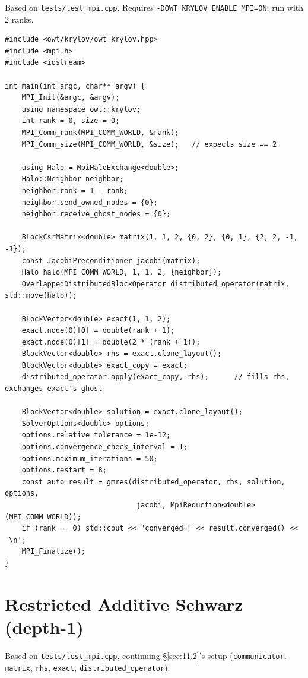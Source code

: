 \documentclass[11pt,a4paper]{report}
\newcommand{\secref}[1]{\S\ref{#1}}
\begin{document}
Based on \texttt{tests/test\_mpi.cpp}. Requires
\lstinline!-DOWT_KRYLOV_ENABLE_MPI=ON!; run with 2 ranks.

\begin{lstlisting}
#include <owt/krylov/owt_krylov.hpp>
#include <mpi.h>
#include <iostream>

int main(int argc, char** argv) {
    MPI_Init(&argc, &argv);
    using namespace owt::krylov;
    int rank = 0, size = 0;
    MPI_Comm_rank(MPI_COMM_WORLD, &rank);
    MPI_Comm_size(MPI_COMM_WORLD, &size);   // expects size == 2

    using Halo = MpiHaloExchange<double>;
    Halo::Neighbor neighbor;
    neighbor.rank = 1 - rank;
    neighbor.send_owned_nodes = {0};
    neighbor.receive_ghost_nodes = {0};

    BlockCsrMatrix<double> matrix(1, 1, 2, {0, 2}, {0, 1}, {2, 2, -1, -1});
    const JacobiPreconditioner jacobi(matrix);
    Halo halo(MPI_COMM_WORLD, 1, 1, 2, {neighbor});
    OverlappedDistributedBlockOperator distributed_operator(matrix, std::move(halo));

    BlockVector<double> exact(1, 1, 2);
    exact.node(0)[0] = double(rank + 1);
    exact.node(0)[1] = double(2 * (rank + 1));
    BlockVector<double> rhs = exact.clone_layout();
    BlockVector<double> exact_copy = exact;
    distributed_operator.apply(exact_copy, rhs);      // fills rhs, exchanges exact's ghost

    BlockVector<double> solution = exact.clone_layout();
    SolverOptions<double> options;
    options.relative_tolerance = 1e-12;
    options.convergence_check_interval = 1;
    options.maximum_iterations = 50;
    options.restart = 8;
    const auto result = gmres(distributed_operator, rhs, solution, options,
                               jacobi, MpiReduction<double>(MPI_COMM_WORLD));
    if (rank == 0) std::cout << "converged=" << result.converged() << '\n';
    MPI_Finalize();
}
\end{lstlisting}

\section{Restricted Additive Schwarz (depth-1)}
\label{sec:11.3}

Based on \texttt{tests/test\_mpi.cpp}, continuing \secref{sec:11.2}'s
setup (\lstinline!communicator!, \lstinline!matrix!, \lstinline!rhs!, \lstinline!exact!,
\lstinline!distributed_operator!).
\end{document}
